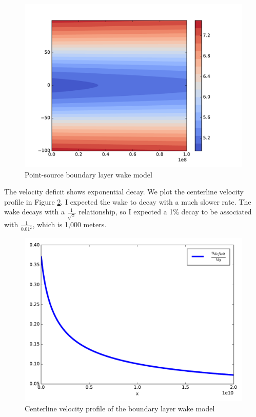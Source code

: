 \documentclass{article}
\begin{document}
\begin{figure}[htb!]
\centering
\includegraphics[scale=.5]{boundarywake}
\caption{\label{blw}Point-source boundary layer wake model}
\end{figure}

The velocity deficit shows exponential decay. We plot the centerline velocity profile in Figure \ref{p3cl}. I expected the wake to decay with a much slower rate. The wake decays with a $\frac{1}{\sqrt{x}}$ relationship, so I expected a 1\% decay to be associated with $\frac{1}{0.01^2}$, which is 1,000 meters.

\begin{figure}[htb!]
\centering
\includegraphics[scale=.5]{p3centerline}
\caption{\label{p3cl} Centerline velocity profile of the boundary layer wake model}
\end{figure}
\end{document}
